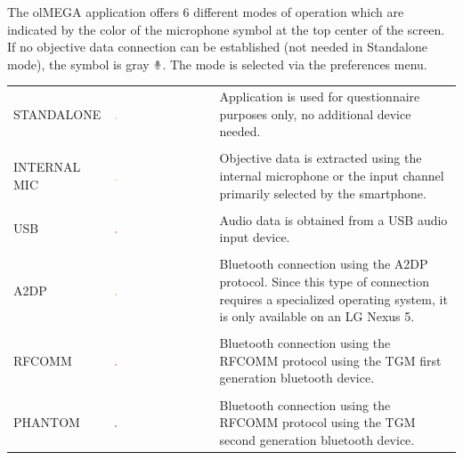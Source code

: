 \documentclass[11pt,a4paper,titlepage]{article}
\begin{document}
The olMEGA application offers 6 different modes of operation which are indicated by the color of the microphone symbol at the top center of the screen. If no objective data connection can be established (not needed in Standalone mode), the symbol is gray \includegraphics[width=0.02\textwidth]{images/mic_gray.png}. The mode is selected via the preferences menu.

\begin{center}
	\begin{tcolorbox}[colback=black!10!white,colframe=black!50!white, boxsep=1pt,left=4pt,right=4pt,top=4pt,bottom=2pt]
		\begin{tabularx}{\textwidth}{llX} 
		STANDALONE & \includegraphics[width=0.02\textwidth]{images/mic_airplaneblue.png} & Application is used for questionnaire purposes only, no additional device needed.\\
		\\
		INTERNAL MIC & \includegraphics[width=0.02\textwidth]{images/mic_orange.png} & Objective data is extracted using the internal microphone or the input channel primarily selected by the smartphone.\\
		\\
		USB & \includegraphics[width=0.02\textwidth]{images/mic_jadered.png} & Audio data is obtained from a USB audio input device.\\
		\\
		A2DP & \includegraphics[width=0.02\textwidth]{images/mic_green.png} & Bluetooth connection using the A2DP protocol. Since this type of connection requires a specialized operating system, it is only available on an LG Nexus 5.\\
		\\
		RFCOMM & \includegraphics[width=0.02\textwidth]{images/mic_violet.png} & Bluetooth connection using the RFCOMM protocol using the TGM first generation bluetooth device.\\
		\\
		PHANTOM & \includegraphics[width=0.02\textwidth]{images/mic_darkblue.png} & Bluetooth connection using the RFCOMM protocol using the TGM second generation bluetooth device.
		\end{tabularx}
	\end{tcolorbox}
\end{center}
\end{document}
